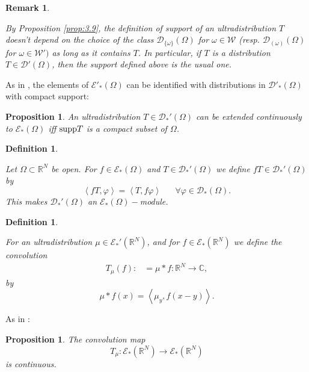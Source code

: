 \documentclass[twoside]{amsart}
\newtheorem{Rem}[Th]{Remark}
\newtheorem{Def}[Th]{Definition}
\newtheorem{Prop}[Th]{Proposition}
\begin{document}
\begin{Rem}
\begin{em}
By Proposition \ref{prop:3.9}, the definition of support of an ultradistribution
$T$ doesn't depend on the choice of the class ${\mathcal{D}}_{\{\omega\}}(\Omega)$ for
$\omega\in{\mathcal{W}}$ (resp. ${\mathcal{D}}_{(\omega)}(\Omega)$ for $\omega\in{\mathcal{W}}')$ as long
as it contains $T$. In particular, if $T$ is a distribution 
$T\in{\mathcal{D}}'(\Omega)$,
then the support defined above is the usual one.
\end{em}
\end{Rem}

As in \cite[Prop. 5.3]{BMT}, the elements of ${\mathcal{E}}'_*(\Omega)$ can be identified
with distributions in ${\mathcal{D}}'_*(\Omega)$ with compact support:
\begin{Prop}
\label{prop:5.3}
An ultradistribution $T\in{\mathcal{D}}_*'(\Omega)$ can be extended
continuously to ${\mathcal{E}}_*(\Omega)$ iff ${\mathop{\rm supp}\nolimits} T$ is
a compact subset of $\Omega$.
\end{Prop}

\begin{Def}
\begin{em}
  Let $\Omega\subset{\mathbb R}^N$ be open. For $f\in{\mathcal{E}}_*(\Omega)$ and
  $T\in{\mathcal{D}}_*'(\Omega)$
we define $fT\in{\mathcal{D}}_*'(\Omega)$ by 
\[
\left\langle fT,\varphi\right\rangle =\left\langle T,f\varphi
\right\rangle \,\,\,\,\,\,\,\,\,\,\forall\varphi\in{\mathcal{D}}_*(\Omega).
\]
This makes ${\mathcal{D}}_*'(\Omega)$ an ${\mathcal{E}}_*(\Omega)-$module.
\end{em}
\end{Def}

\begin{Def}
  \begin{em}
For an ultradistribution $\mu\in{\mathcal{E}}_*'({\mathbb R}^N)$, and for $f\in{\mathcal{E}}_*({\mathbb R}^N)$ we
define the convolution 
\begin{align*}
T_{\mu}(f): & =\mu*f:{\mathbb R}^N\rightarrow\mathbb{C},
\end{align*}
by
\[
\mu*f(x)=\left\langle \mu_{y},f(x-y)\right\rangle .
\]
\end{em}
\end{Def}

As in \cite[Prop. 6.3]{BMT}:
\begin{Prop}
The convolution map
\[
T_{\mu}:{\mathcal{E}}_*({\mathbb R}^N)\rightarrow{\mathcal{E}}_*({\mathbb R}^N)
\]
is continuous.
  \end{Prop}
\end{document}
